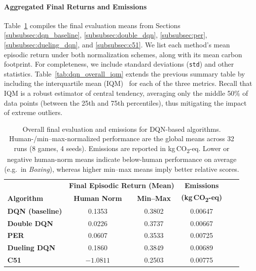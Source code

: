 \paragraph{Aggregated Final Returns and Emissions}
Table~\ref{tab:dqn_overall} compiles the final evaluation means from Sections \ref{subsubsec:dqn_baseline}, \ref{subsubsec:double_dqn}, \ref{subsubsec:per}, \ref{subsubsec:dueling_dqn}, and \ref{subsubsec:c51}. We list each method’s mean episodic return under both normalization schemes, along with its mean carbon footprint. For completeness, we include standard deviations (\texttt{std}) and other statistics. Table~\ref{tab:dqn_overall_iqm} extends the previous summary table by including the interquartile mean (IQM)~\cite{agarwal:statistical_precipice} for each of the three metrics. Recall that IQM is a robust estimator of central tendency, averaging only the middle 50\% of data points (between the 25th and 75th percentiles), thus mitigating the impact of extreme outliers.

\begin{table}
	\caption{Overall final evaluation and emissions for DQN-based algorithms. 
		Human-/min--max-normalized performance are the global means across 32 runs (8 games, 4 seeds). 
		Emissions are reported in kg\,CO\textsubscript{2}-eq. 
		Lower or negative human-norm means indicate below-human performance on average (e.g.\ in \emph{Boxing}), 
		whereas higher min--max means imply better relative scores.}
	\label{tab:dqn_overall}
	\centering
	\begin{tabular}{lccccc}
		\toprule
		& \multicolumn{2}{c}{\textbf{Final Episodic Return (Mean)}} & 
		\multicolumn{1}{c}{\textbf{Emissions}} \\
		\cmidrule(lr){2-3} \cmidrule(lr){4-4}
		\textbf{Algorithm} & \textbf{Human Norm} & \textbf{Min--Max} & \textbf{(kg\,CO\textsubscript{2}-eq)} \\
		\midrule
		\textbf{DQN (baseline)} & 0.1353 & 0.3802 & 0.00647 \\
		\textbf{Double DQN}     & 0.0226 & 0.3737 & 0.00667 \\
		\textbf{PER}            & 0.0607 & 0.3533 & 0.00725 \\
		\textbf{Dueling DQN}    & 0.1860 & 0.3849 & 0.00689 \\
		\textbf{C51}            & $-1.0811$ & 0.2503 & 0.00775 \\
		\bottomrule
	\end{tabular}
\end{table}

